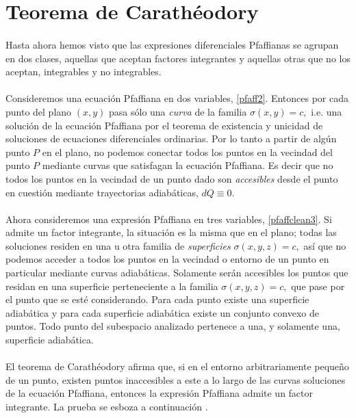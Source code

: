 \documentclass{article}
\theoremstyle{definition} \newtheorem{defi}{Definici\'on}
\theoremstyle{definition} \newtheorem{teo}{Teorema}
\theoremstyle{definition} \newtheorem{cor}{Corolario}
\begin{document}
\section{Teorema de Carath\'eodory}
\paragraph{}
Hasta ahora hemos visto que las expresiones diferenciales Pfaffianas se agrupan en dos clases, aquellas que aceptan factores integrantes y aquellas otras que no los aceptan, integrables y no integrables.
\paragraph{}
Consideremos una ecuaci\'on Pfaffiana en dos variables, \eqref{pfaff2}. Entonces por cada punto del plano $(x, y)$ pasa s\'olo una \emph{curva} de la familia $\sigma(x, y) = c,$ i.e. una soluci\'on de la ecuaci\'on Pfaffiana por el teorema de existencia y unicidad de soluciones de ecuaciones diferenciales ordinarias. Por lo tanto a partir de alg\'un punto $P$ en el plano, no podemos conectar todos los puntos en la vecindad del punto $P$ mediante curvas que satisfagan la ecuaci\'on Pfaffiana. Es decir que no todos los puntos en la vecindad de un punto dado son \emph{accesibles} desde el punto en cuesti\'on mediante trayectorias adiab\'aticas, $dQ\equiv0.$
\paragraph{}
Ahora consideremos una expresi\'on Pfaffiana en tres variables, \eqref{pfaffclean3}. Si admite un factor integrante, la situaci\'on es la misma que en el plano; todas las soluciones residen en una u otra familia de \emph{superficies} $\sigma(x, y, z) = c,$ as\'i que no podemos acceder a todos los puntos en la vecindad o entorno de un punto en particular mediante curvas adiab\'aticas. Solamente ser\'an accesibles los puntos que residan en una superficie perteneciente a la familia $\sigma(x, y, z) = c,$ que pase por el punto que se est\'e considerando. Para cada punto existe una superficie adiab\'atica y para cada superficie adiab\'atica existe un conjunto convexo de puntos. Todo punto del subespacio analizado pertenece a una, y solamente una, superficie adiab\'atica.
\paragraph{}
El teorema de Carath\'eodory afirma que, si en el entorno arbitrariamente peque\~no de un punto, existen puntos inaccesibles a este a lo largo de las curvas soluciones de la ecuaci\'on Pfaffiana, entonces la expresi\'on Pfaffiana admite un factor integrante. La prueba se esboza a continuaci\'on \cite{CK}.
\end{document}
